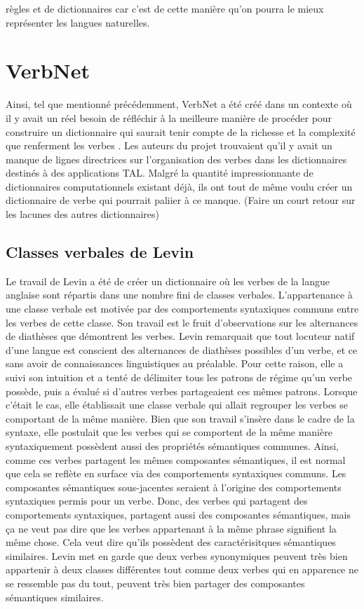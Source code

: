 règles et de dictionnaires car c'est de cette manière qu'on pourra le mieux représenter les langues naturelles.

\section{VerbNet}

Ainsi, tel que mentionné précédemment, VerbNet a été créé dans un contexte où il y avait un réel besoin de réfléchir à la meilleure manière de procéder pour construire un dictionnaire qui saurait tenir compte de la richesse et la complexité que renferment les verbes \citep{KipperClassBasedConstructionVerb2000}. Les auteurs du projet trouvaient qu'il y avait un manque de lignes directrices sur l'organisation des verbes dans les dictionnaires destinés à des applications TAL. Malgré la quantité impressionnante de dictionnaires computationnels existant déjà, ils ont tout de même voulu créer un dictionnaire de verbe qui pourrait paliier à ce manque. (Faire un court retour sur les lacunes des autres dictionnaires)

\subsection{Classes verbales de Levin}

Le travail de Levin\citep{verb-classes.levin.1993} a été de créer un dictionnaire où les verbes de la langue anglaise sont répartis dans une nombre fini de classes verbales. L'appartenance à une classe verbale est motivée par des comportements syntaxiques communs entre les verbes de cette classe. Son travail est le fruit d'observations sur les alternances de diathèses que démontrent les verbes. Levin remarquait que tout locuteur natif d'une langue est conscient des alternances de diathèses possibles d'un verbe, et ce sans avoir de connaissances linguistiques au préalable. Pour cette raison, elle a suivi son intuition et a tenté de délimiter tous les patrons de régime qu'un verbe possède, puis a évalué si d'autres verbes partageaient ces mêmes patrons. Lorsque c'était le cas, elle établissait une classe verbale qui allait regrouper les verbes se comportant de la même manière. Bien que son travail s'insère dans le cadre de la syntaxe, elle postulait que les verbes qui se comportent de la même manière syntaxiquement possèdent aussi des propriétés sémantiques communes. Ainsi, comme ces verbes partagent les mêmes composantes sémantiques, il est normal que cela se reflète en surface via des comportements syntaxiques communs. Les composantes sémantiques sous-jacentes seraient à l'origine des comportements syntaxiques permis pour un verbe. Donc, des verbes qui partagent des comportements syntaxiques, partagent aussi des composantes sémantiques, mais ça ne veut pas dire que les verbes appartenant à la même phrase signifient la même chose. Cela veut dire qu'ils possèdent des caractérisitques sémantiques similaires. Levin met en garde que deux verbes synonymiques peuvent très bien appartenir à deux classes différentes tout comme deux verbes qui en apparence ne se ressemble pas du tout, peuvent très bien partager des composantes sémantiques similaires.

